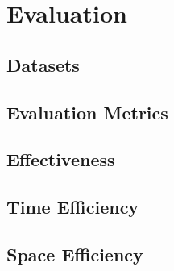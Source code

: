 \section{Evaluation}
\subsection{Datasets}
\subsection{Evaluation Metrics}
\subsection{Effectiveness}
\subsection{Time Efficiency}
\subsection{Space Efficiency}